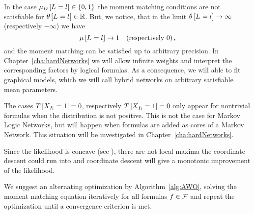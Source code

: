 In the case $\mu_{D}\left[L_{}=l_{}\right]\in\{0,1\}$ the moment matching conditions are not satisfiable for $\theta\left[L_{}=l_{}\right]\in\mathbb{R}$.
But, we notice, that in the limit $\theta\left[L_{}=l_{}\right]\rightarrow \infty $ (respectively $-\infty$) we have
	\[ \mu\left[L_{}=l_{}\right] \rightarrow  1 \quad \text{(respectively $0$)}\, ,  \]
and the moment matching can be satisfied up to arbitrary precision.
In Chapter~\ref{cha:hardNetworks} we will allow infinite weights and interpret the corresponding factors by logical formulas.
As a consequence, we will able to fit graphical models, which we will call hybrid networks on arbitrary satisfiable mean parameters.

%
The cases $T\left[X_{f_{l}}=1\right]=0$, respectively $T\left[X_{f_{l}}=1\right]=0$ only appear for nontrivial formulas when the distribution is not positive. 
This is not the case for Markov Logic Networks, but will happen when formulas are added as cores of a Markov Network.
This situation will be investigated in Chapter~\ref{cha:hardNetworks}.


Since the likelihood is concave (see \cite{koller_probabilistic_2009}), there are not local maxima the coordinate descent could run into and coordinate descent will give a monotonic improvement of the likelihood. 

We suggest an alternating optimization by Algorithm~\ref{alg:AWO}, solving the moment matching equation iteratively for all formulas $f\in\mathcal{F}$ and repeat the optimization until a convergence criterion is met.


